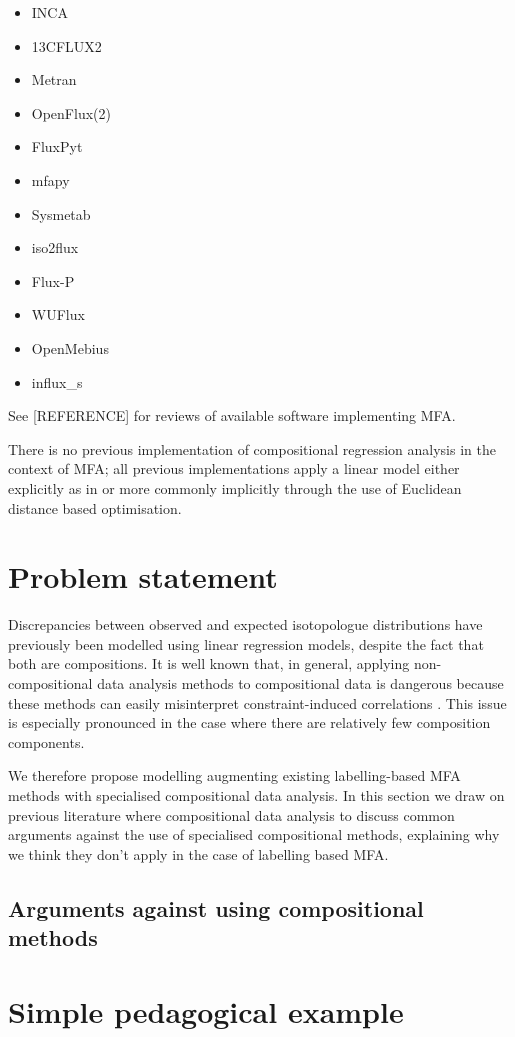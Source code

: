 \documentclass{article}
\def\tightlist{}
\begin{document}
\begin{itemize}
\tightlist
\item
  INCA
\item
  13CFLUX2
\item
  Metran
\item
  OpenFlux(2)
\item
  FluxPyt
\item
  mfapy
\item
  Sysmetab
\item
  iso2flux
\item
  Flux-P
\item
  WUFlux
\item
  OpenMebius
\item
  influx\_s
\end{itemize}

See {[}REFERENCE{]} for reviews of available software implementing MFA.

There is no previous implementation of compositional regression analysis
in the context of MFA; all previous implementations apply a linear model
either explicitly as in \citep[Eq. 3]{theorellBeCertainUncertainty2017}
or more commonly implicitly through the use of Euclidean distance based
optimisation.

\section{Problem statement}\label{problem-statement}

Discrepancies between observed and expected isotopologue distributions
have previously been modelled using linear regression models, despite
the fact that both are compositions. It is well known that, in general,
applying non-compositional data analysis methods to compositional data
is dangerous because these methods can easily misinterpret
constraint-induced correlations \citep[Ch.
3]{aitchisonjStatisticalAnalysisCompositional}. This issue is especially
pronounced in the case where there are relatively few composition
components.

We therefore propose modelling augmenting existing labelling-based MFA
methods with specialised compositional data analysis. In this section we
draw on previous literature where compositional data analysis to discuss
common arguments against the use of specialised compositional methods,
explaining why we think they don't apply in the case of labelling based
MFA.

\subsection{Arguments against using compositional
methods}\label{arguments-against-using-compositional-methods}

\section{Simple pedagogical example}\label{simple-pedagogical-example}




\end{document}
